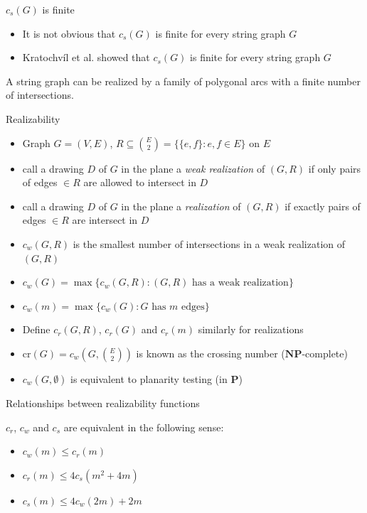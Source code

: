 \documentclass[10pt,aspectratio=169]{beamer}
\theoremstyle{plain}
\newcommand{\set}[1]{\{#1\}}
\begin{document}
\begin{frame}{\(c_s(G)\) is finite}
    \begin{itemize}
        \item It is not obvious that \(c_s(G)\) is finite for every string graph \(G\)
        \item Kratochvíl et al. showed that \(c_s(G)\) is finite for every string graph \(G\)
    \end{itemize}
    \begin{lemma}
        A string graph can be realized by a family of polygonal arcs with a finite number of intersections.
        \label{lem:finite-cs}
    \end{lemma}
\end{frame}

\begin{frame}{Realizability}
    \begin{itemize}
        \item Graph \(G = (V, E)\), \(R \subseteq \binom{E}{2} = \set{\set{e, f} : e, f \in E} \) on \(E\)
        \item call a drawing \(D\) of \(G\) in the plane a \textit{weak realization} of \((G, R)\) if only pairs of edges \(\in R\) are allowed to intersect in \(D\)
        \item call a drawing \(D\) of \(G\) in the plane a \textit{realization} of \((G, R)\) if exactly pairs of edges \(\in R\) are intersect in \(D\)
        \pause
        \item \(c_w(G, R)\) is the smallest number of intersections in a weak realization of \((G, R)\)
        \item \(c_w(G) = \max\set{c_w(G, R) : (G, R) \text{ has a weak realization}} \)
        \item \(c_w(m) = \max\set{c_w(G) : G \text{ has } m \text{ edges}}\)
        \item Define \(c_r(G, R)\), \(c_r(G)\) and \(c_r(m)\) similarly for realizations
        \pause
        \item \(\mathrm{cr}(G) = c_w(G, \binom{E}{2})\) is known as the crossing number (\(\mathbf{NP}\)-complete)
        \item \(c_w(G, \emptyset)\) is equivalent to planarity testing (in \(\mathbf{P}\))
    \end{itemize}
\end{frame}

\begin{frame}{Relationships between realizability functions}
    \begin{lemma}
        \(c_r\), \(c_w\) and \(c_s\) are equivalent in the following sense:
        \begin{itemize}
            \item \(c_w(m) \leq c_r(m)\)
            \item \(c_r(m) \leq 4 c_s(m^2 + 4m)\)
            \item \(c_s(m) \leq 4 c_w(2m) + 2m\)
        \end{itemize}
        \label{lem:pol-equivalent}
    \end{lemma}
\end{frame}
\end{document}

